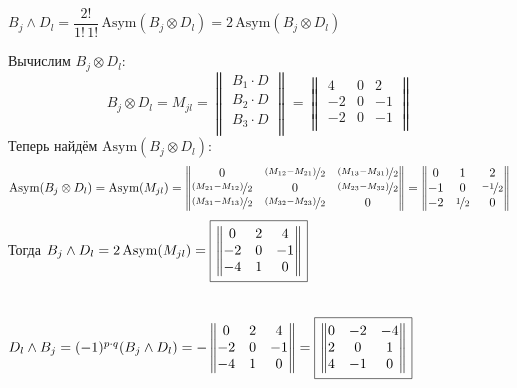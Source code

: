 \documentclass{article}
\newcommand*\squared[1]{\tikz[baseline=(char.base)]{
            \node[shape=rectangle,draw,inner sep=4pt] (char) {#1};}}
\begin{document}
\begin{center}
$B_j \wedge D_l = \dfrac{2!}{1!\,1!}\,\text{Asym}(B_j\otimes D_l) = 2\,\text{Asym}(B_j\otimes D_l)$
\end{center}
Вычислим $B_j\otimes D_l$:
$$B_j\otimes D_l = M_{jl} = \begin{Vmatrix}
B_1 \cdot D \\
B_2 \cdot D \\
B_3 \cdot D \\
\end{Vmatrix} = \begin{Vmatrix}
4 & 0 & 2 \\
-2 & 0 & -1 \\
-2 & 0 & -1 \\
\end{Vmatrix}$$
Теперь найдём $\text{Asym}(B_j\otimes D_l)$:
$$\text{Asym}(B_j\otimes D_l) = \text{Asym}(M_{jl}) = \begin{Vmatrix}
0 & \nicefrac{(M_{12} - M_{21})}{2} & \nicefrac{(M_{13} - M_{31})}{2} \\
\nicefrac{(M_{21} - M_{12})}{2} & 0 & \nicefrac{(M_{23} - M_{32})}{2} \\
\nicefrac{(M_{31} - M_{13})}{2} & \nicefrac{(M_{32} - M_{23})}{2} & 0
\end{Vmatrix} = \begin{Vmatrix}
0 & 1 & 2 \\
-1 & 0 & \nicefrac{-1}{2} \\
-2 & \nicefrac{1}{2} & 0
\end{Vmatrix}$$
Тогда $B_j\wedge D_l = 2\,\text{Asym}(M_{jl}) = \squared{$\begin{Vmatrix}
0 & 2 & 4 \\
-2 & 0 & -1 \\
-4 & 1 & 0
\end{Vmatrix}$}$
\, \\ \, \\
\begin{center}
$D_l \wedge B_j = (-1)^{p\cdot q}(B_j\wedge D_l) = - \begin{Vmatrix}
0 & 2 & 4 \\
-2 & 0 & -1 \\
-4 & 1 & 0
\end{Vmatrix} = \squared{$\begin{Vmatrix}
0 & -2 & -4 \\
2 & 0 & 1 \\
4 & -1 & 0
\end{Vmatrix}$}$
\end{center}
\, \\
\end{document}
